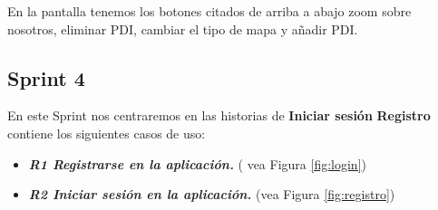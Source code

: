 En la pantalla tenemos los botones citados de arriba a abajo zoom sobre nosotros, eliminar PDI, cambiar el tipo de mapa y añadir PDI. 

\subsection{Sprint 4}

En este Sprint nos centraremos en las historias de  \textbf{Iniciar sesión }
\textbf{Registro} contiene los siguientes casos de uso:



\begin{itemize}
\item\textbf{ \textit{R1  Registrarse en la aplicación.}}  ( vea Figura \ref{fig:login})
\item \textbf{\textit{R2 Iniciar sesión en la aplicación. }}  (vea Figura \ref{fig:registro})

\end{itemize} 
